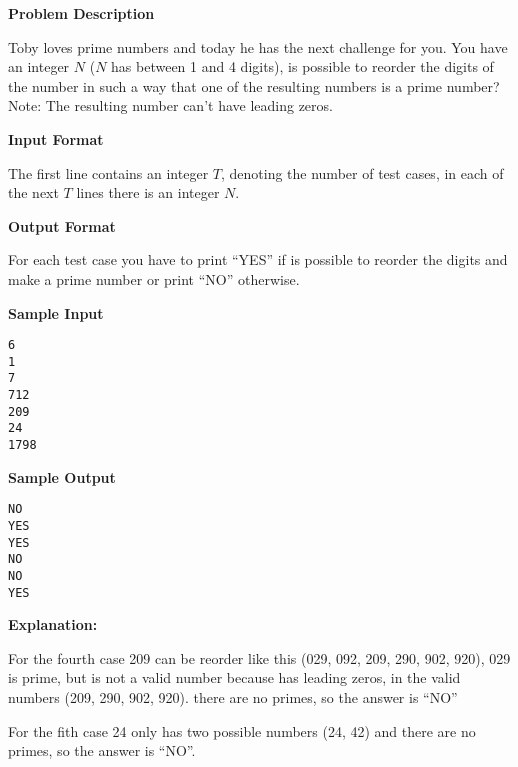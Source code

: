 \textbf{\large Problem Description}

Toby loves prime numbers and today he has the next challenge for you.
You have an integer $N$ ($N$ has between 1 and 4 digits), is possible to reorder the
digits of the number in such a way that one of the resulting numbers is a prime number?
Note: The resulting number can't have leading zeros.

\textbf{\large Input Format}

The first line contains an integer $T$, denoting the number of test cases, in each of
the next $T$ lines there is an integer $N$.

\textbf{\large Output Format}

For each test case you have to print ``YES'' if is possible to reorder the digits and make
a prime number or print ``NO'' otherwise.

\textbf{\large Sample Input}

\begin{verbatim}
6
1
7
712
209
24
1798
\end{verbatim}

\textbf{\large Sample Output}

\begin{verbatim}
NO
YES
YES
NO
NO
YES
\end{verbatim}

\textbf{\large Explanation:}

For the fourth case 209 can be reorder like this (029, 092, 209, 290, 902, 920), 029 is prime,
but is not a valid number because has leading zeros, in the valid numbers (209, 290, 902, 920).
there are no primes, so the answer is ``NO''

For the fith case 24 only has two possible numbers (24, 42) and there are no primes, so the
answer is ``NO''.

\newpage